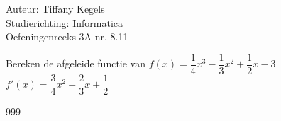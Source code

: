 \documentclass[a4paper]{article}
\begin{document}
  
\noindent \large Auteur: Tiffany Kegels \\
\noindent \large Studierichting: Informatica\\
\noindent \large Oefeningenreeks 3A nr. 8.11\\

\medskip

\normalsize

Bereken de afgeleide functie van $f(x) = \dfrac{1}{4}x^3 - \dfrac{1}{3}x^2 + \dfrac{1}{2}x - 3$\\

$f'(x) = \dfrac{3}{4}x^2 - \dfrac{2}{3}x + \dfrac{1}{2}$\\


\begin{thebibliography}{999}

\end{thebibliography}
\end{document}
